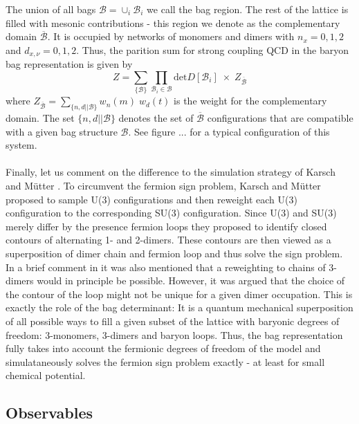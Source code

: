 \documentclass{PoS}
\begin{document}
The union of all bags $\mathcal{B} = \cup_i \mathcal{B}_i$ we call the bag region. The rest of the lattice is filled with mesonic contributions - this region we denote as the complementary domain $\overline{\mathcal{B}}$. It is occupied by networks of  monomers and dimers with $n_x = 0,1,2$ and $d_{x,\nu} = 0,1,2$. Thus, the parition sum for strong coupling QCD in the baryon bag representation is given by
\begin{equation}
Z = \sum_{\{\mathcal{B}\}}\prod_{\mathcal{B}_i \in \mathcal{B}} \text{det}D[\mathcal{B}_i] \; \times \; Z_{\overline{\mathcal{B}}}
\end{equation}
where $Z_{\overline{\mathcal{B}}} = \sum_{\{n, d || \mathcal{B}\}} w_n(m) \; w_d(t)$ is the weight for the complementary domain. The set $\{n, d || \mathcal{B}\}$ denotes the set of $\overline{\mathcal{B}}$ configurations that are compatible with a given bag structure $\mathcal{B}$. See figure ... for a typical configuration of this system.\\
\\
Finally, let us comment on the difference to the simulation strategy of Karsch and M\"utter \cite{Karsch:1988zx}. To circumvent the fermion sign problem, Karsch and M\"utter proposed to sample U(3) configurations and then reweight each U(3) configuration to the corresponding SU(3) configuration. Since U(3) and SU(3) merely differ by the presence fermion loops they proposed to identify closed contours of alternating 1- and 2-dimers. These contours are then viewed as a superposition of dimer chain and fermion loop and thus solve the sign problem. In a brief comment in \cite{Karsch:1988zx} it was also mentioned that a reweighting to chains of 3-dimers would in principle be possible. However, it was argued that the choice of the contour of the loop might not be unique for a given dimer occupation. This is exactly the role of the bag determinant: It is a quantum mechanical superposition of all possible ways to fill a given subset of the lattice with baryonic degrees of freedom: 3-monomers, 3-dimers and baryon loops. Thus, the bag representation fully takes into account the fermionic degrees of freedom of the model and simulataneously solves the fermion sign problem exactly - at least for small chemical potential.

\subsection{Observables}
\end{document}
